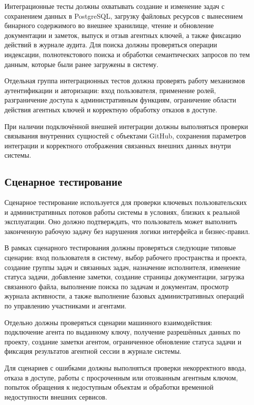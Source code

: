 Интеграционные тесты должны охватывать создание и изменение задач с сохранением данных в PostgreSQL, загрузку файловых ресурсов с вынесением бинарного содержимого во внешнее хранилище, чтение и обновление документации и заметок, выпуск и отзыв агентных ключей, а также фиксацию действий в журнале аудита. Для поиска должны проверяться операции индексации, полнотекстового поиска и обработки семантических запросов по тем данным, которые были ранее загружены в систему.

Отдельная группа интеграционных тестов должна проверять работу механизмов аутентификации и авторизации: вход пользователя, применение ролей, разграничение доступа к административным функциям, ограничение области действия агентных ключей и корректную обработку отказов в доступе.

При наличии подключённой внешней интеграции должны выполняться проверки связывания внутренних сущностей с объектами GitHub, сохранения параметров интеграции и корректного отображения связанных внешних данных внутри системы.

\textheadingsep
\subsection{Сценарное тестирование}

\headingtextsep

Сценарное тестирование используется для проверки ключевых пользовательских и административных потоков работы системы в условиях, близких к реальной эксплуатации. Оно должно подтверждать, что пользователь может выполнить законченную рабочую задачу без нарушения логики интерфейса и бизнес-правил.

В рамках сценарного тестирования должны проверяться следующие типовые сценарии: вход пользователя в систему, выбор рабочего пространства и проекта, создание группы задач и связанных задач, назначение исполнителя, изменение статуса задачи, добавление заметки, создание страницы документации, загрузка связанного файла, выполнение поиска по задачам и документам, просмотр журнала активности, а также выполнение базовых административных операций по управлению участниками и агентами.

Отдельно должны проверяться сценарии машинного взаимодействия: подключение агента по выданному ключу, получение разрешённых данных по проекту, создание заметки агентом, ограниченное обновление статуса задачи и фиксация результатов агентной сессии в журнале системы.

Для сценариев с ошибками должны выполняться проверки некорректного ввода, отказа в доступе, работы с просроченным или отозванным агентным ключом, попыток обращения к недоступным объектам и обработки временной недоступности внешних сервисов.

